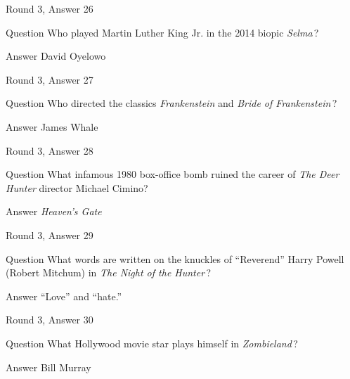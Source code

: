 \documentclass[11pt]{beamer}
\begin{document}
\begin{frame}[t]{Round 3, Answer 26}
\vspace{2em}
\begin{block}{Question}
Who played Martin Luther King Jr. in the 2014 biopic \emph{Selma}\,?
\end{block}
\pause{}
\begin{block}{Answer}
David Oyelowo
\end{block}
\end{frame}
    

\begin{frame}[t]{Round 3, Answer 27}
\vspace{2em}
\begin{block}{Question}
Who directed the classics \emph{Frankenstein} and \emph{Bride of Frankenstein}\,?
\end{block}
\pause{}
\begin{block}{Answer}
James Whale
\end{block}
\end{frame}
    

\begin{frame}[t]{Round 3, Answer 28}
\vspace{2em}
\begin{block}{Question}
What infamous 1980 box-office bomb ruined the career of \emph{The Deer Hunter} director Michael Cimino?
\end{block}
\pause{}
\begin{block}{Answer}
\emph{Heaven's Gate}
\end{block}
\end{frame}
    

\begin{frame}[t]{Round 3, Answer 29}
\vspace{2em}
\begin{block}{Question}
What words are written on the knuckles of ``Reverend'' Harry Powell (Robert Mitchum) in \emph{The Night of the Hunter}\,?
\end{block}
\pause{}
\begin{block}{Answer}
``Love'' and ``hate.''
\end{block}
\end{frame}
    

\begin{frame}[t]{Round 3, Answer 30}
\vspace{2em}
\begin{block}{Question}
What Hollywood movie star plays himself in \emph{Zombieland}\,?
\end{block}
\pause{}
\begin{block}{Answer}
Bill Murray
\end{block}
\end{frame}
    
\end{document}
